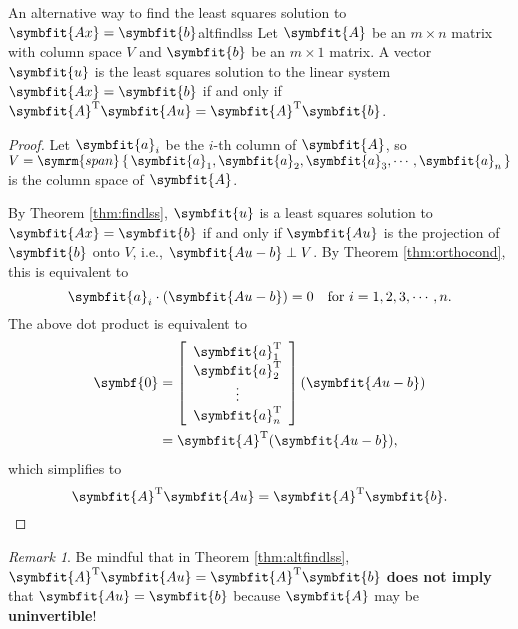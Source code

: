\documentclass[math]{amznotes}
\theoremstyle{remark}
\newtheorem*{remark}{Remark}
\begin{document}
\begin{thmbox}{An alternative way to find the least squares solution to $\symbfit{Ax} = \symbfit{b}$}{altfindlss}
    Let $\symbfit{A}$ be an $m \times n$ matrix with column space $V$ and $\symbfit{b}$ be an $m \times 1$ matrix. A vector $\symbfit{u}$ is the least squares solution to the linear system $\symbfit{Ax} = \symbfit{b}$ if and only if $\symbfit{A}^{\mathrm{T}}\symbfit{Au} = \symbfit{A}^{\mathrm{T}}\symbfit{b}$.
    \tcblower
    \begin{proof}
        Let $\symbfit{a}_i$ be the $i$-th column of $\symbfit{A}$, so $V = \symrm{span}\left\{ \, \symbfit{a}_1, \symbfit{a}_2, \symbfit{a}_3, \cdots, \symbfit{a}_n \, \right\}$ is the column space of $\symbfit{A}$.

        By Theorem \ref{thm:findlss}, $\symbfit{u}$ is a least squares solution to $\symbfit{Ax} = \symbfit{b}$ if and only if $\symbfit{Au}$ is the projection of $\symbfit{b}$ onto $V$, i.e., $\symbfit{Au - b} \perp V$. By Theorem \ref{thm:orthocond}, this is equivalent to
        \begin{displaymath}
            \symbfit{a}_i \cdot (\symbfit{Au - b}) = 0 \quad \textrm{for } i = 1, 2, 3, \cdots, n.
        \end{displaymath} 
        The above dot product is equivalent to
        \begin{align*}
            \symbf{0} & = \left[\begin{array}{c}
                \symbfit{a}_1^{\mathrm{T}} \\
                \symbfit{a}_2^{\mathrm{T}} \\
                \vdots \\
                \symbfit{a}_n^{\mathrm{T}} \\
            \end{array}\right](\symbfit{Au - b}) \\
            & = \symbfit{A}^{\mathrm{T}}(\symbfit{Au - b}),
        \end{align*}
        which simplifies to
        \begin{equation*}
            \symbfit{A}^{\mathrm{T}}\symbfit{Au} = \symbfit{A}^{\mathrm{T}}\symbfit{b}.
        \end{equation*}
    \end{proof}
\end{thmbox}
\begin{notebox}
    \begin{remark}
        Be mindful that in Theorem \ref{thm:altfindlss}, $\symbfit{A}^{\mathrm{T}}\symbfit{Au} = \symbfit{A}^{\mathrm{T}}\symbfit{b}$ {\color{red} \textbf{does not imply}} that $\symbfit{Au} = \symbfit{b}$ because $\symbfit{A}$ may be {\color{red} \textbf{uninvertible}}!
    \end{remark}
\end{notebox}
\end{document}
